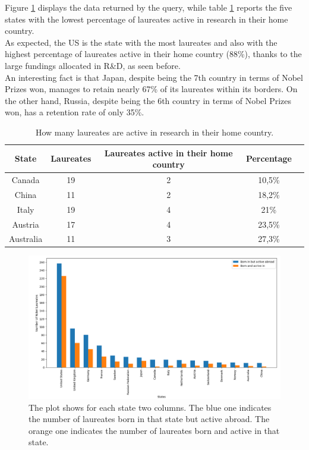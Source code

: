 \documentclass{article}
\begin{document}
\noindent Figure \ref{fig:laureatesComparison} displays the data returned by the query, while table \ref{tab:laureates_active} reports the five states with the lowest percentage
of laureates active in research in their home country.\\
As expected, the US is the state with the most laureates and also with the highest percentage
of laureates active in their home country (88\%), thanks to the large fundings allocated in R\&D, as seen before.\\
An interesting fact is that Japan, despite being the 7th country in terms of Nobel Prizes won, manages to retain nearly 67\% of its laureates
within its borders. On the other hand, Russia, despite being the 6th country in terms of Nobel Prizes won, has a retention rate of only 35\%.

\begin{table}[h!]
	\centering
	\begin{tabular}{|c|c|c|c|c|}
		\hline
		\textbf{State}    & \textbf{Laureates} & \textbf{Laureates active in their home country} & \textbf{Percentage} \\ \hline
		Canada & 19 & 2 & 10,5\% \\ \hline
		China & 11 & 2 & 18,2\% \\ \hline
        Italy & 19 & 4 & 21\% \\ \hline
        Austria & 17 & 4 & 23,5\% \\ \hline
        Australia & 11 & 3 & 27,3\% \\ \hline
	\end{tabular}
    \caption{How many laureates are active in research in their home country.}
	\label{tab:laureates_active}
\end{table}

\begin{figure}[H]
	\centering
	\includegraphics[width=\textwidth]{../queries/plots/laureatesComparison.png}
    \caption{The plot shows for each state two columns. The blue one indicates the number of laureates born in that state but active abroad.
    The orange one indicates the number of laureates born and active in that state.}
    \label{fig:laureatesComparison}
\end{figure}
\end{document}
